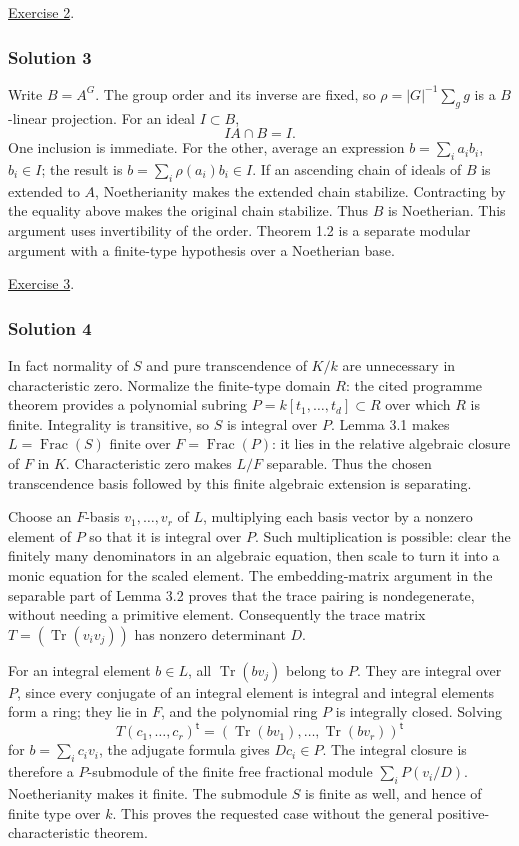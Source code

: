 \documentclass[
]{article}
\begin{document}
\hyperref[exercise-2]{Exercise 2}.

\subsubsection{Solution 3}\label{solution-3}

Write \(B=A^G\). The group order and its inverse are fixed, so
\(\rho=|G|^{-1}\sum_g g\) is a \(B\)-linear projection. For an ideal
\(I\subset B\), \[
IA\cap B=I.
\] One inclusion is immediate. For the other, average an expression
\(b=\sum_i a_i b_i\), \(b_i\in I\); the result is
\(b=\sum_i\rho(a_i)b_i\in I\). If an ascending chain of ideals of \(B\)
is extended to \(A\), Noetherianity makes the extended chain stabilize.
Contracting by the equality above makes the original chain stabilize.
Thus \(B\) is Noetherian. This argument uses invertibility of the order.
Theorem 1.2 is a separate modular argument with a finite-type hypothesis
over a Noetherian base.

\hyperref[exercise-3]{Exercise 3}.

\subsubsection{Solution 4}\label{solution-4}

In fact normality of \(S\) and pure transcendence of \(K/k\) are
unnecessary in characteristic zero. Normalize the finite-type domain
\(R\): the cited programme theorem provides a polynomial subring
\(P=k [t_1,\ldots,t_d]\subset R\) over which \(R\) is finite.
Integrality is transitive, so \(S\) is integral over \(P\). Lemma 3.1
makes \(L=\operatorname{Frac}(S)\) finite over
\(F=\operatorname{Frac}(P)\): it lies in the relative algebraic closure
of \(F\) in \(K\). Characteristic zero makes \(L/F\) separable. Thus the
chosen transcendence basis followed by this finite algebraic extension
is separating.

Choose an \(F\)-basis \(v_1,\ldots,v_r\) of \(L\), multiplying each
basis vector by a nonzero element of \(P\) so that it is integral over
\(P\). Such multiplication is possible: clear the finitely many
denominators in an algebraic equation, then scale to turn it into a
monic equation for the scaled element. The embedding-matrix argument in
the separable part of Lemma 3.2 proves that the trace pairing is
nondegenerate, without needing a primitive element. Consequently the
trace matrix \(T=(\operatorname{Tr}(v_iv_j))\) has nonzero determinant
\(D\).

For an integral element \(b\in L\), all \(\operatorname{Tr}(bv_j)\)
belong to \(P\). They are integral over \(P\), since every conjugate of
an integral element is integral and integral elements form a ring; they
lie in \(F\), and the polynomial ring \(P\) is integrally closed.
Solving \[
T(c_1,\ldots,c_r)^\mathsf{t}
=(\operatorname{Tr}(bv_1),\ldots,\operatorname{Tr}(bv_r))^\mathsf{t}
\] for \(b=\sum_i c_iv_i\), the adjugate formula gives \(Dc_i\in P\).
The integral closure is therefore a \(P\)-submodule of the finite free
fractional module \(\sum_i P(v_i/D)\). Noetherianity makes it finite.
The submodule \(S\) is finite as well, and hence of finite type over
\(k\). This proves the requested case without the general
positive-characteristic theorem.
\end{document}
